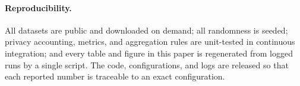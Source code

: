\paragraph{Reproducibility.}
All datasets are public and downloaded on demand; all randomness is seeded;
privacy accounting, metrics, and aggregation rules are unit-tested in continuous
integration; and every table and figure in this paper is regenerated from logged
runs by a single script. The code, configurations, and logs are released so that
each reported number is traceable to an exact configuration.
